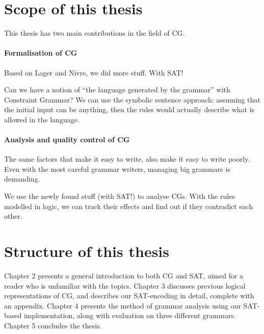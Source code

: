 \section{Scope of this thesis}
This thesis has two main contributions in the field of CG.

\paragraph{Formalisation of CG}

Based on Lager and Nivre, we did more stuff. With SAT!

Can we have a notion of ``the language generated by the grammar'' with Constraint Grammar?  
We can use the symbolic sentence approach: assuming that the initial input can be anything, then the rules would actually describe what is allowed in the language.

\paragraph{Analysis and quality control of CG}

The same factors that make it easy to write, also make it easy to write poorly.  
Even with the most careful grammar writers, managing big grammars is demanding.

We use the newly found stuff (with SAT!) to analyse CGs.
With the rules modelled in logic, we can track their effects and find out if they contradict each other.




\section{Structure of this thesis}

Chapter 2 presents a general introduction to both CG and SAT, aimed for a reader who is unfamiliar with the topics.
Chapter 3 discusses previous logical representations of CG, and describes our SAT-encoding in detail, complete with an appendix.
Chapter 4 presents the method of grammar analysis using our SAT-based implementation, along with evaluation on three different grammars.
Chapter 5 concludes the thesis.
